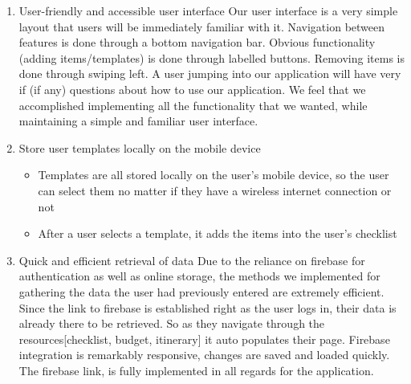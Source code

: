 \documentclass[12pt]{article}
\begin{document}
	\begin{enumerate}
		\item{User-friendly and accessible user interface}
		Our user interface is a very simple layout that users will be immediately familiar with it. Navigation between features is done through a bottom navigation bar.
		Obvious functionality (adding items/templates) is done through labelled buttons. Removing items is done through swiping left.
		A user jumping into our application will have very if (if any) questions about how to use our application.
		We feel that we accomplished implementing all the functionality that we wanted, while maintaining a simple and familiar user interface.

		\item{Store user templates locally on the mobile device}
		\begin{itemize}
			\item Templates are all stored locally on the user's mobile device, so the user can select them no matter if they have a wireless internet connection or not
			\item After a user selects a template, it adds the items into the user's checklist
		\end{itemize}

		\item{Quick and efficient retrieval of data}
		Due to the reliance on firebase for authentication as well as online storage, the methods we implemented for gathering the data the user had previously entered
		are extremely efficient.
		Since the link to firebase is established right as the user logs in, their data is already there to be retrieved.
		So as they navigate through the resources[checklist, budget, itinerary] it auto populates their page.
		Firebase integration is remarkably responsive, changes are saved and loaded quickly.
		The firebase link, is fully implemented in all regards for the application.
	\end{enumerate}

	\pagebreak
\end{document}
